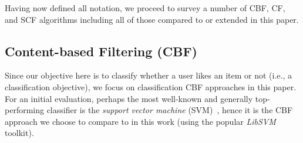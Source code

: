 %
%

Having now defined all notation, we proceed to survey a number of 
CBF, CF, and SCF algorithms including all of those 
compared to or extended in this paper.

\subsection{Content-based Filtering (CBF)}

Since our objective here is to classify
whether a user likes an item or not (i.e., a classification
objective), we focus on classification CBF approaches in this paper.
For an initial evaluation, perhaps the most well-known and generally
top-performing classifier is the \emph{support vector machine}
(SVM)~\cite{svms}, hence it is the CBF approach we choose to compare
to in this work (using the popular \emph{LibSVM}~\cite{libsvm} toolkit).

